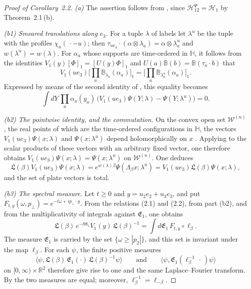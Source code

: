 \documentclass[11pt]{amsart}
\theoremstyle{definition}
\begin{document}
\begin{proof}[Proof of Corollary~2.2]
\emph{(a)} The assertion follows from \cite[Proposition~14.47\,(c)]{QEDII}, since $\mathcal H^{\Psi}_{12}=\mathcal H_1$ by Theorem~2.1\,(b).

\emph{(b1) Smeared translations along $e_3$.}
For a tuple $\lambda$ of labels let $\lambda^u$ be the tuple with the profiles $\chi_a(\,\cdot-u)$; then $\tau_{ue_3}\cdot(\alpha\otimes\lambda_a)=\allowbreak \alpha\otimes\lambda_a^u$ and $w(\lambda^u)=w(\lambda)$.
For $\alpha_a$ whose supports are time-ordered in $\mathbb H$, it follows from the identities $V_1(y)[\Phi]_1=[U(y)\Phi]_1$ \cite[Definition~2.38]{QEDII} and $U(a)\mathbb B(b)=\mathbb B(\tau_a\cdot b)$ \cite[Lemma~14.3\,(a)]{QEDII} that
\begin{equation*}
V_1(ue_3)\Big[\prod_a\mathbb B_{\lambda_a}(\alpha_a)\Big]_1=\Big[\prod_a\mathbb B_{\lambda_a^u}(\alpha_a)\Big]_1.
\end{equation*}
Expressed by means of the second identity of \cite[Proposition~14.22\,(b)]{QEDII}, this equality becomes
\begin{equation*}
\int dY\,\prod_a\alpha_a(y_a)\,\big(V_1(ue_3)\Psi(Y;\lambda)-\Psi(Y;\lambda^u)\big)=0.
\end{equation*}

\emph{(b2) The pointwise identity, and the commutation.}
On the convex open set $\mathcal W^{(n)}$, the real points of which are the time-ordered configurations in $\mathbb H$, the vectors $V_1(ue_3)\Psi(x;\lambda)$ and $\Psi(x;\lambda^u)$ depend holomorphically on $x$ \cite[Proposition~14.22\,(c)]{QEDII}.
Applying \cite[Lemma~14.10\,(g), (a)]{QEDII} to the scalar products of these vectors with an arbitrary fixed vector, one therefore obtains $V_1(ue_3)\Psi(x;\lambda)=\Psi(x;\lambda^u)$ on $\mathcal W^{(n)}$.
One deduces
\begin{equation*}
\mathfrak L(\beta)V_1(ue_3)\Psi(x;\lambda)=e^{w(\lambda)\beta}\Psi(\Lambda_\beta x;\lambda^u)=V_1(ue_3)\mathfrak L(\beta)\Psi(x;\lambda),
\end{equation*}
and the set of plate vectors is total.

\emph{(b3) The spectral measure.}
Let $t\ge0$ and $y=u_2e_2+u_3e_3$, and put $F_{t,y}(\omega,p_\perp)=e^{-t\omega+ip_\perp\cdot y}$.
From the relations (2.1) and (2.2), from part (b2), and from the multiplicativity of integrals against $\mathfrak E_1$, one obtains
\begin{equation*}
\mathfrak L(\beta)\,e^{-t\mathsf H_1}V_1(y)\,\mathfrak L(\beta)^{-1}=\int d\mathfrak E_1\,F_{t,y}\circ\ell_\beta.
\end{equation*}
The measure $\mathfrak E_1$ is carried by the set $\{\omega\ge|p_2|\}$, and this set is invariant under the map $\ell_\beta$.
For each $\psi$, the finite positive measures
\begin{equation*}
\langle\psi,\mathfrak L(\beta)\,\mathfrak E_1(\cdot)\,\mathfrak L(\beta)^{-1}\psi\rangle\qquad\text{and}\qquad\langle\psi,\mathfrak E_1(\ell_\beta^{-1}\,\cdot\,)\psi\rangle
\end{equation*}
on $[0,\infty)\times\mathbb R^2$ therefore give rise to one and the same Laplace--Fourier transform.
By \cite[Lemma~12.25]{QEDII} the two measures are equal; moreover, $\ell_\beta^{-1}=\ell_{-\beta}$.


\end{proof}
\end{document}
